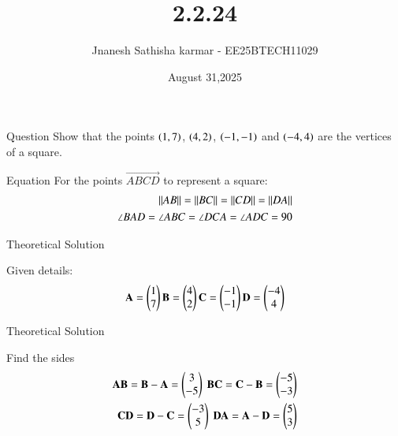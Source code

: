 \documentclass{beamer}
\title %
{2.2.24}
\date{August 31,2025}
\author 
{Jnanesh Sathisha karmar - EE25BTECH11029}
\begin{document}
\frame{\titlepage}
\begin{frame}{Question}
Show that the points $\left(1, 7\right)$, $\left(4, 2\right)$, $\left(-1, -1\right)$ and $\left(-4, 4\right)$ are the vertices of a square.
\end{frame}



\begin{frame}{Equation}
For the points $\vec{ABCD}$ to represent a square:
\begin{align}
    \left\lVert AB\right\rVert=\left\lVert BC\right\rVert=\left\lVert CD\right\rVert=\left\lVert DA\right\rVert\\
    \angle{BAD}=\angle{ABC}=\angle{DCA}=\angle{ADC}=90
\end{align}
\end{frame}
\begin{frame}{Theoretical Solution}

Given details:
\begin{align}
    \mathbf{A}=\begin{pmatrix}1\\7\end{pmatrix}  \mathbf{B}=\begin{pmatrix}4\\2\end{pmatrix} \mathbf{C}=\begin{pmatrix}-1\\-1\end{pmatrix} \mathbf{D}=\begin{pmatrix}-4\\4\end{pmatrix}
\end{align}
\end{frame}

\begin{frame}{Theoretical Solution}

Find the sides
\begin{align}
\vec{AB}=\vec{B}-\vec{A}=\myvec{3\\-5} \  \vec{BC}=\vec{C}-\vec{B}=\myvec{-5\\-3} \\
\vec{CD}=\vec{D}-\vec{C}=\myvec{-3\\5} \ 
\vec{DA}=\vec{A}-\vec{D}=\myvec{5\\3}
\end{align}

\end{frame}
\end{document}
